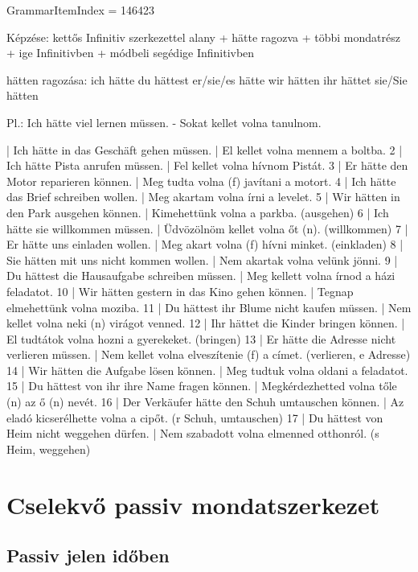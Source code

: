 \documentclass{article}
\newenvironment{desc}{\verbatim}{\endverbatim}
\newenvironment{exmp}{\verbatim}{\endverbatim}
\begin{document}
GrammarItemIndex = 146423

\begin{desc}
Képzése: kettős Infinitiv szerkezettel
alany + hätte ragozva + többi mondatrész + ige Infinitivben + módbeli segédige Infinitivben

hätten ragozása:
ich hätte
du hättest
er/sie/es hätte
wir hätten
ihr hättet
sie/Sie hätten

Pl.: Ich hätte viel lernen müssen. - Sokat kellet volna tanulnom.
\end{desc}

\begin{exmp}
1 | Ich hätte in das Geschäft gehen müssen. | El kellet volna mennem a boltba.
2 | Ich hätte Pista anrufen müssen. | Fel kellet volna hívnom Pistát.
3 | Er hätte den Motor reparieren können. | Meg tudta volna (f) javítani a motort.
4 | Ich hätte das Brief schreiben wollen. | Meg akartam volna írni a levelet.
5 | Wir hätten in den Park ausgehen können. | Kimehettünk volna a parkba. (ausgehen)
6 | Ich hätte sie willkommen müssen. | Üdvözölnöm kellet volna őt (n). (willkommen)
7 | Er hätte uns einladen wollen. | Meg akart volna (f) hívni minket. (einkladen)
8 | Sie hätten mit uns nicht kommen wollen. | Nem akartak volna velünk jönni.
9 | Du hättest die Hausaufgabe schreiben müssen. | Meg kellett volna írnod a házi feladatot.
10 | Wir hätten gestern in das Kino gehen können. | Tegnap elmehettünk volna moziba.
11 | Du hättest ihr Blume nicht kaufen müssen. | Nem kellet volna neki (n) virágot venned.
12 | Ihr hättet die Kinder bringen können. | El tudtátok volna hozni a gyerekeket. (bringen)
13 | Er hätte die Adresse nicht verlieren müssen. | Nem kellet volna elveszítenie (f) a címet. (verlieren, e Adresse)
14 | Wir hätten die Aufgabe lösen können. | Meg tudtuk volna oldani a feladatot.
15 | Du hättest von ihr ihre Name fragen können. | Megkérdezhetted volna tőle (n) az ő (n) nevét.
16 | Der Verkäufer hätte den Schuh umtauschen können. | Az eladó kicserélhette volna a cipőt. (r Schuh, umtauschen)
17 | Du hättest von Heim nicht weggehen dürfen. | Nem szabadott volna elmenned otthonról. (s Heim, weggehen)
\end{exmp}

\section{Cselekvő passiv mondatszerkezet}

\subsection{Passiv jelen időben}
\end{document}
